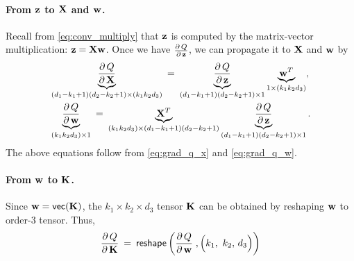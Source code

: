 \documentclass[11pt]{article}
\numberwithin{equation}{section}
\def\K{{\bf K}}
\def\w{{\bf w}}
\def\X{{\bf X}}
\def\z{{\bf z}}
\def\vect{\mathsf{vec}}
\begin{document}
\paragraph{From $\z$ to $\X$ and $\w$.}
Recall from \eqref{eq:conv_multiply} that $\z$ is computed by the matrix-vector multiplication: $\z= \X \w$.
Once we have $\frac{ \partial \, Q}{\partial \, \z}$, we can propagate it to $\X$ and $\w$ by
\begin{align*}
    & \underbrace{\frac{ \partial \, Q }{ \partial \, \X } }_{(d_1 - k_1 + 1)  (d_2 - k_2 + 1)  \times (k_1 k_2 d_3)}
    \: = \: \underbrace{\frac{ \partial \, Q }{ \partial \, \z } }_{(d_1 - k_1 + 1)  (d_2 - k_2 + 1)  \times 1}
    \underbrace{\w^T }_{ 1 \times (k_1 k_2 d_3)} ,\\
    & \underbrace{ \frac{ \partial \, Q }{ \partial \, \w } }_{ (k_1 k_2 d_3) \times 1} 
    \: = \:\underbrace{\X^T }_{(k_1 k_2 d_3) \times (d_1 - k_1 + 1)  (d_2 - k_2 + 1)}
    \underbrace{\frac{ \partial \, Q }{ \partial \, \z } }_{(d_1 - k_1 + 1)  (d_2 - k_2 + 1)  \times 1} .
\end{align*}
The above equations follow from \eqref{eq:grad_q_x} and \eqref{eq:grad_q_w}.


\paragraph{From $\w$ to $\K$.}
Since $\w = \vect (\K) $, the $k_1\times k_2 \times d_3$ tensor $\K$ can be obtained by \textsf{reshaping} $\w$ to order-3 tensor.
Thus,
\begin{equation*}
    \frac{ \partial \, Q }{ \partial \, \K } \:= \: 
    \textsf{reshape} \left( \frac{\partial \, Q}{\partial \, \w}  \; , \Big( k_1, \,  \, k_2 , \, d_3 \Big)  \right)
\end{equation*}
\end{document}
